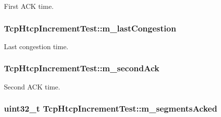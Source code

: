 First A\+CK time. 

\subsubsection[{\texorpdfstring{m\+\_\+last\+Congestion}{m_lastCongestion}}]{ Tcp\+Htcp\+Increment\+Test\+::m\+\_\+last\+Congestion\hspace{0.3cm}{\ttfamily [private]}}\hypertarget{classTcpHtcpIncrementTest_a497d4d2a1569ce8d34bbd358a71d1148}{}\label{classTcpHtcpIncrementTest_a497d4d2a1569ce8d34bbd358a71d1148}


Last congestion time. 

\subsubsection[{\texorpdfstring{m\+\_\+second\+Ack}{m_secondAck}}]{ Tcp\+Htcp\+Increment\+Test\+::m\+\_\+second\+Ack\hspace{0.3cm}{\ttfamily [private]}}\hypertarget{classTcpHtcpIncrementTest_a3e1e1e7ec629ab9a9f923749cfff3c5b}{}\label{classTcpHtcpIncrementTest_a3e1e1e7ec629ab9a9f923749cfff3c5b}


Second A\+CK time. 

\subsubsection[{\texorpdfstring{m\+\_\+segments\+Acked}{m_segmentsAcked}}]{\setlength{\rightskip}{0pt plus 5cm}uint32\+\_\+t Tcp\+Htcp\+Increment\+Test\+::m\+\_\+segments\+Acked\hspace{0.3cm}{\ttfamily [private]}}\hypertarget{classTcpHtcpIncrementTest_a6f33c48257c870135c934ae9f1772432}{}\label{classTcpHtcpIncrementTest_a6f33c48257c870135c934ae9f1772432}



